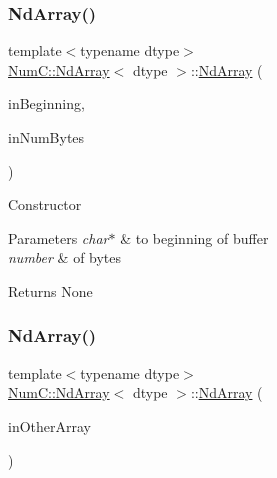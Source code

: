 \subsubsection{\texorpdfstring{Nd\+Array()}{NdArray()}\hspace{0.1cm}{\footnotesize\ttfamily [10/12]}}
{\footnotesize\ttfamily template$<$typename dtype$>$ \\
\mbox{\hyperlink{class_num_c_1_1_nd_array}{Num\+C\+::\+Nd\+Array}}$<$ dtype $>$\+::\mbox{\hyperlink{class_num_c_1_1_nd_array}{Nd\+Array}} (\begin{DoxyParamCaption}\item[{const dtype $\ast$}]{in\+Beginning,  }\item[{\mbox{\hyperlink{namespace_num_c_ae685802ca6d3035f2b400b081e3953fa}{uint32}}}]{in\+Num\+Bytes }\end{DoxyParamCaption})\hspace{0.3cm}{\ttfamily [inline]}}

Constructor


\begin{DoxyParams}{Parameters}
{\em char$\ast$} & to beginning of buffer \\
\hline
{\em number} & of bytes \\
\hline
\end{DoxyParams}
\begin{DoxyReturn}{Returns}
None 
\end{DoxyReturn}
\mbox{\label{class_num_c_1_1_nd_array_aa7353baf388187d002e2064c6d450017}} 
\subsubsection{\texorpdfstring{Nd\+Array()}{NdArray()}\hspace{0.1cm}{\footnotesize\ttfamily [11/12]}}
{\footnotesize\ttfamily template$<$typename dtype$>$ \\
\mbox{\hyperlink{class_num_c_1_1_nd_array}{Num\+C\+::\+Nd\+Array}}$<$ dtype $>$\+::\mbox{\hyperlink{class_num_c_1_1_nd_array}{Nd\+Array}} (\begin{DoxyParamCaption}\item[{const \mbox{\hyperlink{class_num_c_1_1_nd_array}{Nd\+Array}}$<$ dtype $>$ \&}]{in\+Other\+Array }\end{DoxyParamCaption})\hspace{0.3cm}{\ttfamily [inline]}}


